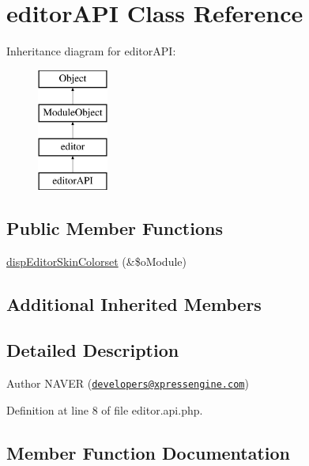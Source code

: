 \hypertarget{classeditorAPI}{}\section{editor\+A\+PI Class Reference}
\label{classeditorAPI}
Inheritance diagram for editor\+A\+PI\+:\begin{figure}[H]
\begin{center}
\leavevmode
\includegraphics[height=4.000000cm]{classeditorAPI}
\end{center}
\end{figure}
\subsection*{Public Member Functions}
\begin{DoxyCompactItemize}
\item 
\hyperlink{classeditorAPI_ac6a42a6742ae44bc20883ad3db8c30a1}{disp\+Editor\+Skin\+Colorset} (\&\$o\+Module)
\end{DoxyCompactItemize}
\subsection*{Additional Inherited Members}


\subsection{Detailed Description}
\begin{DoxyAuthor}{Author}
N\+A\+V\+ER (\href{mailto:developers@xpressengine.com}{\tt developers@xpressengine.\+com}) 
\end{DoxyAuthor}


Definition at line 8 of file editor.\+api.\+php.



\subsection{Member Function Documentation}
\hypertarget{classeditorAPI_ac6a42a6742ae44bc20883ad3db8c30a1}{}\label{classeditorAPI_ac6a42a6742ae44bc20883ad3db8c30a1} 
